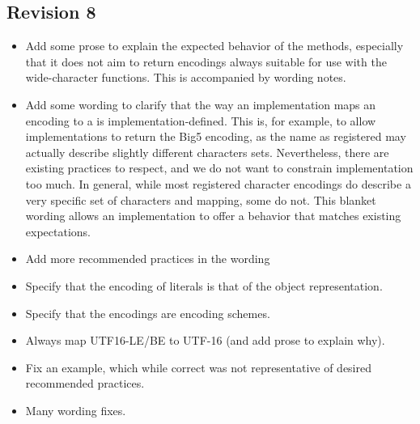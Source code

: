\documentclass{wg21}
\begin{document}
\subsection*{Revision 8}
\begin{itemize}
    \item Add some prose to explain the expected behavior of the  methods, especially that it does not aim to return encodings always suitable for use with the wide-character functions. This is accompanied by wording notes.
    \item Add some wording to clarify that the way an implementation maps an encoding to a  is implementation-defined.
    This is, for example, to allow implementations to return the Big5 encoding, as the name as registered may actually describe slightly different characters sets. Nevertheless, there are existing practices to respect, and we do not want to constrain implementation too much.
    In general, while most registered character encodings do describe a very specific set of characters and mapping, some do not. This blanket wording allows an implementation to offer a behavior that matches existing expectations.
    \item Add more recommended practices in the wording
    \item Specify that the encoding of literals is that of the object representation.
    \item Specify that the encodings are encoding schemes.
    \item Always map UTF16-LE/BE to UTF-16 (and add prose to explain why).
    \item Fix an example, which while correct was not representative of desired recommended practices.
    \item Many wording fixes.

\end{itemize}
\end{document}

